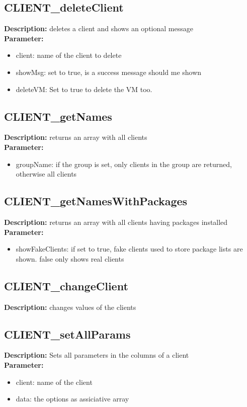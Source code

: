 \subsection{CLIENT\_deleteClient}
\textbf{Description:} deletes a client and shows an optional message\\
\textbf{Parameter:}
\begin{itemize}
\item client: name of the client to delete
\item showMsg: set to true, is a success message should me shown
\item deleteVM: Set to true to delete the VM too.
\end{itemize}

\subsection{CLIENT\_getNames}
\textbf{Description:} returns an array with all clients\\
\textbf{Parameter:}
\begin{itemize}
\item groupName: if the group is set, only clients in the group are returned, otherwise all clients
\end{itemize}

\subsection{CLIENT\_getNamesWithPackages}
\textbf{Description:} returns an array with all clients having packages installed\\
\textbf{Parameter:}
\begin{itemize}
\item showFakeClients: if set to true, fake clients used to store package lists are shown. false only shows real clients
\end{itemize}

\subsection{CLIENT\_changeClient}
\textbf{Description:} changes values of the clients\\

\subsection{CLIENT\_setAllParams}
\textbf{Description:} Sets all parameters in the columns of a client\\
\textbf{Parameter:}
\begin{itemize}
\item client: name of the client
\item data: the options as assiciative array
\end{itemize}

